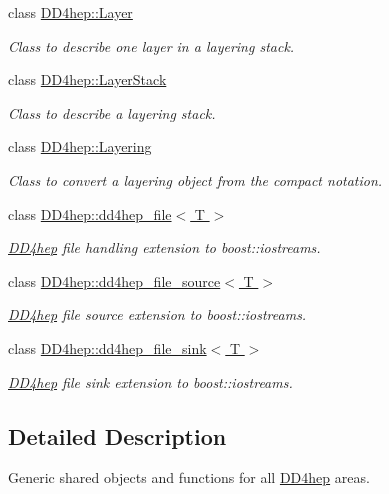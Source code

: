 \begin{DoxyCompactItemize}
class \hyperlink{class_d_d4hep_1_1_layer}{D\+D4hep\+::\+Layer}
\begin{DoxyCompactList}\small\item\em Class to describe one layer in a layering stack. \end{DoxyCompactList}\item 
class \hyperlink{class_d_d4hep_1_1_layer_stack}{D\+D4hep\+::\+Layer\+Stack}
\begin{DoxyCompactList}\small\item\em Class to describe a layering stack. \end{DoxyCompactList}\item 
class \hyperlink{class_d_d4hep_1_1_layering}{D\+D4hep\+::\+Layering}
\begin{DoxyCompactList}\small\item\em Class to convert a layering object from the compact notation. \end{DoxyCompactList}\item 
class \hyperlink{class_d_d4hep_1_1dd4hep__file}{D\+D4hep\+::dd4hep\+\_\+file$<$ T $>$}
\begin{DoxyCompactList}\small\item\em \hyperlink{namespace_d_d4hep}{D\+D4hep} file handling extension to boost\+::iostreams. \end{DoxyCompactList}\item 
class \hyperlink{class_d_d4hep_1_1dd4hep__file__source}{D\+D4hep\+::dd4hep\+\_\+file\+\_\+source$<$ T $>$}
\begin{DoxyCompactList}\small\item\em \hyperlink{namespace_d_d4hep}{D\+D4hep} file source extension to boost\+::iostreams. \end{DoxyCompactList}\item 
class \hyperlink{class_d_d4hep_1_1dd4hep__file__sink}{D\+D4hep\+::dd4hep\+\_\+file\+\_\+sink$<$ T $>$}
\begin{DoxyCompactList}\small\item\em \hyperlink{namespace_d_d4hep}{D\+D4hep} file sink extension to boost\+::iostreams. \end{DoxyCompactList}\end{DoxyCompactItemize}


\subsection{Detailed Description}
Generic shared objects and functions for all \hyperlink{namespace_d_d4hep}{D\+D4hep} areas. 


